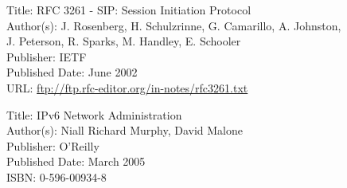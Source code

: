 \documentclass[a4paper,12pt]{article}
\begin{document}
Title: RFC 3261 - SIP: Session Initiation Protocol \\
Author(s): J. Rosenberg, H. Schulzrinne, G. Camarillo, A. Johnston, \\
\indent J. Peterson, R. Sparks, M. Handley, E. Schooler \\
Publisher: IETF \\
Published Date: June 2002  \\
URL: \url{ftp://ftp.rfc-editor.org/in-notes/rfc3261.txt}	 

Title: IPv6 Network Administration \\
Author(s): Niall Richard Murphy, David Malone \\
Publisher: O'Reilly \\
Published Date: March 2005  \\
ISBN: 0-596-00934-8	 
\end{document}
